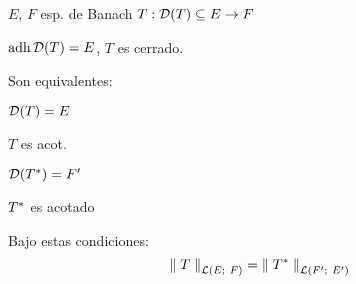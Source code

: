 
\renewcommand{\catnum}{\theNPclase \ No Presencial}%
\renewcommand{\fecha}{27 de abril de 2020}


\begin{thm}
$E$, $F$ esp. de Banach
$T : \mathcal{D}(T) \subseteq E \to F$

$\operatorname{\mathop{\text{\upshape{adh}}}} \mathcal{D}(T) = E$, $T$ es cerrado.

Son equivalentes:

\begin{ienumerate}
    \item $\mathcal{D}(T) = E$
    \item $T$ es acot.
    \item $ \mathcal{D} (T^{*}) = F' $
    \item $T^{*}$ es acotado
\end{ienumerate}

Bajo estas condiciones:$$
\norm[\cl (E;\ F)]{T} = \norm[\cl (F';\ E')]{T\adj}
$$

\end{thm}

